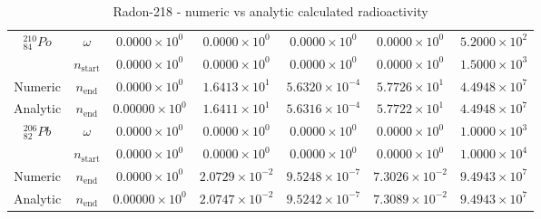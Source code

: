 \begin{table}[h]
\begin{center}
\begin{longtable}{c c c c c c c}
\hline
${}^{210}_{84}Po$ & $\omega$ & 
${0.0000} \times 10^{0}$ & ${0.0000} \times 10^{0}$ & ${0.0000} \times 10^{0}$ &
${0.0000} \times 10^{0}$ & ${5.2000} \times 10^{2}$ \\
 & $n_{\text{start}}$ & 
${0.0000} \times 10^{0}$ & ${0.0000} \times 10^{0}$ & ${0.0000} \times 10^{0}$ &
${0.0000} \times 10^{0}$ & ${1.5000} \times 10^{3}$ \\
Numeric & $n_{\text{end}}$ & 
${0.0000} \times 10^{0}$ & ${1.6413} \times 10^{1}$ & ${5.6320} \times 10^{-4}$ & 
${5.7726} \times 10^{1}$ & ${4.4948} \times 10^{7}$ \\
Analytic & $n_{\text{end}}$ & 
${0.00000} \times 10^{0}$ & ${1.6411} \times 10^{1}$ & ${5.6316} \times 10^{-4}$ & 
${5.7722} \times 10^{1}$ & ${4.4948} \times 10^{7}$ \\
\hline
${}^{206}_{82}Pb$ & $\omega$ & 
${0.0000} \times 10^{0}$ & ${0.0000} \times 10^{0}$ & ${0.0000} \times 10^{0}$ &
${0.0000} \times 10^{0}$ & ${1.0000} \times 10^{3}$ \\
 & $n_{\text{start}}$ & 
${0.0000} \times 10^{0}$ & ${0.0000} \times 10^{0}$ & ${0.0000} \times 10^{0}$ &
${0.0000} \times 10^{0}$ & ${1.0000} \times 10^{4}$ \\
Numeric & $n_{\text{end}}$ & 
${0.0000} \times 10^{0}$ & ${2.0729} \times 10^{-2}$ & ${9.5248} \times 10^{-7}$ & 
${7.3026} \times 10^{-2}$ & ${9.4943} \times 10^{7}$ \\
Analytic & $n_{\text{end}}$ & 
${0.00000} \times 10^{0}$ & ${2.0747} \times 10^{-2}$ & ${9.5242} \times 10^{-7}$ & 
${7.3089} \times 10^{-2}$ & ${9.4943} \times 10^{7}$ \\
\hline\hline
\end{longtable}
\end{center}
\caption{Radon-218 - numeric vs analytic calculated radioactivity}
\label{table:rn218trialdata}
\end{table}
































